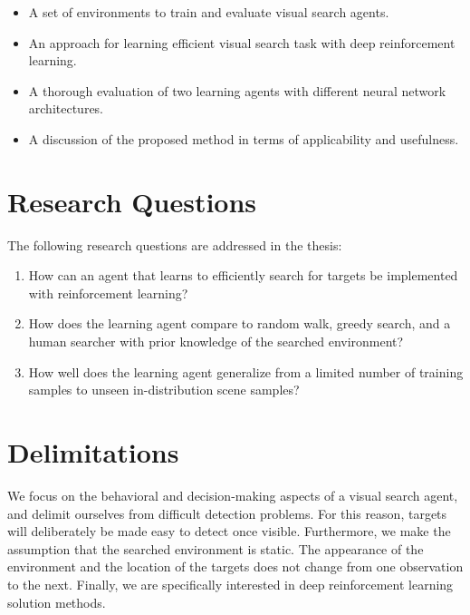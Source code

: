 \begin{itemize}
  \item A set of environments to train and evaluate visual search agents.
  \item An approach for learning efficient visual search task with deep reinforcement learning.
  \item A thorough evaluation of two learning agents with different neural network architectures.
  \item A discussion of the proposed method in terms of applicability and usefulness.
\end{itemize}

\section{Research Questions}
\label{sec:questions}

The following research questions are addressed in the thesis:

\begin{enumerate}
  \item \label{itm:rq1} How can an agent that learns to efficiently search for targets be implemented with reinforcement learning?
  \item \label{itm:rq2} How does the learning agent compare to random walk, greedy search, and a human searcher with prior knowledge of the searched environment?
  \item \label{itm:rq3} How well does the learning agent generalize from a limited number of training samples to unseen in-distribution scene samples?
\end{enumerate}

\section{Delimitations}
\label{sec:delimitations}

We focus on the behavioral and decision-making aspects of a visual search agent, and delimit ourselves from difficult detection problems.
For this reason, targets will deliberately be made easy to detect once visible.
Furthermore, we make the assumption that the searched environment is static.
The appearance of the environment and the location of the targets does not change from one observation to the next.
Finally, we are specifically interested in deep reinforcement learning solution methods.
